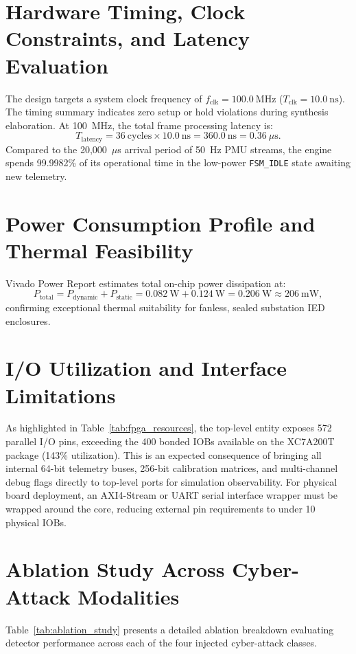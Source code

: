\documentclass[11pt,a4paper]{report}
\begin{document}
\section{Hardware Timing, Clock Constraints, and Latency Evaluation}
The design targets a system clock frequency of $f_{\text{clk}} = 100.0~\text{MHz}$ ($T_{\text{clk}} = 10.0~\text{ns}$).
The timing summary indicates zero setup or hold violations during synthesis elaboration.
At 100~MHz, the total frame processing latency is:
\begin{equation}
T_{\text{latency}} = 36~\text{cycles} \times 10.0~\text{ns} = 360.0~\text{ns} = 0.36~\mu\text{s}.
\end{equation}
Compared to the 20,000~$\mu$s arrival period of 50~Hz PMU streams, the engine spends 99.9982\%
of its operational time in the low-power \texttt{FSM\_IDLE} state awaiting new telemetry.

\section{Power Consumption Profile and Thermal Feasibility}
Vivado Power Report estimates total on-chip power dissipation at:
\begin{equation}
P_{\text{total}} = P_{\text{dynamic}} + P_{\text{static}} = 0.082~\text{W} + 0.124~\text{W} = 0.206~\text{W} \approx 206~\text{mW},
\end{equation}
confirming exceptional thermal suitability for fanless, sealed substation IED enclosures.

\section{I/O Utilization and Interface Limitations}
As highlighted in Table~\ref{tab:fpga_resources}, the top-level entity exposes 572 parallel
I/O pins, exceeding the 400 bonded IOBs available on the XC7A200T package (143\% utilization).
This is an expected consequence of bringing all internal 64-bit telemetry buses, 256-bit
calibration matrices, and multi-channel debug flags directly to top-level ports for simulation
observability. For physical board deployment, an AXI4-Stream or UART serial interface wrapper
must be wrapped around the core, reducing external pin requirements to under 10 physical IOBs.

\section{Ablation Study Across Cyber-Attack Modalities}
\label{sec:ablation}
Table~\ref{tab:ablation_study} presents a detailed ablation breakdown evaluating detector
performance across each of the four injected cyber-attack classes.
\end{document}
